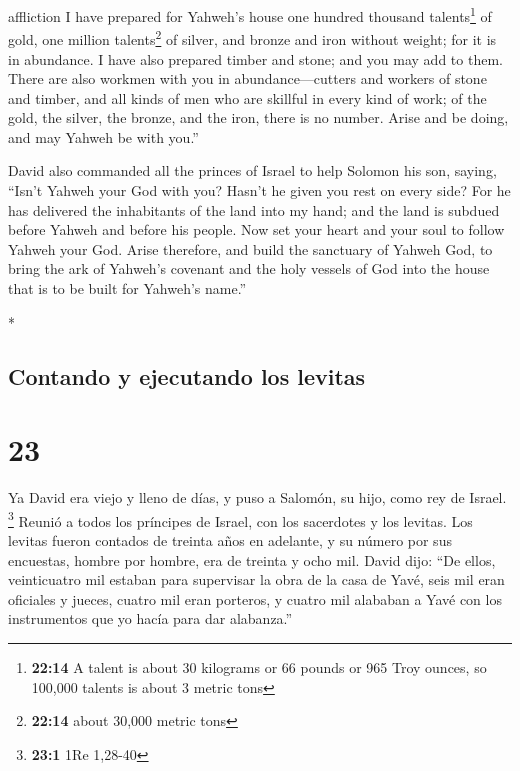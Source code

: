 \begin{paracol}{2}
\begin{otherlanguage}{english}
affliction I have prepared for Yahweh's house one hundred thousand
talents\footnote{\textbf{22:14} A talent is about 30 kilograms or 66
  pounds or 965 Troy ounces, so 100,000 talents is about 3 metric tons}
of gold, one million talents\footnote{\textbf{22:14} about 30,000 metric
  tons} of silver, and bronze and iron without weight; for it is in
abundance. I have also prepared timber and stone; and you may add to
them.  There are also workmen with you in
abundance---cutters and workers of stone and timber, and all kinds of
men who are skillful in every kind of work;  of the gold,
the silver, the bronze, and the iron, there is no number. Arise and be
doing, and may Yahweh be with you.''

 David also commanded all the princes of Israel to help
Solomon his son, saying,  ``Isn't Yahweh your God with
you? Hasn't he given you rest on every side? For he has delivered the
inhabitants of the land into my hand; and the land is subdued before
Yahweh and before his people.  Now set your heart and
your soul to follow Yahweh your God. Arise therefore, and build the
sanctuary of Yahweh God, to bring the ark of Yahweh's covenant and the
holy vessels of God into the house that is to be built for Yahweh's
name.''

\end{otherlanguage}

\switchcolumn[0]*

\hypertarget{contando-y-ejecutando-los-levitas}{%
\subsection{Contando y ejecutando los
levitas}\label{contando-y-ejecutando-los-levitas}}

\hypertarget{section-44}{%
\section{23}\label{section-44}}

 Ya David era viejo y lleno de días, y puso a Salomón, su
hijo, como rey de Israel. \footnote{\textbf{23:1} 1Re 1,28-40}
 Reunió a todos los príncipes de Israel, con los
sacerdotes y los levitas.  Los levitas fueron contados de
treinta años en adelante, y su número por sus encuestas, hombre por
hombre, era de treinta y ocho mil.  David dijo: ``De
ellos, veinticuatro mil estaban para supervisar la obra de la casa de
Yavé, seis mil eran oficiales y jueces,  cuatro mil eran
porteros, y cuatro mil alababan a Yavé con los instrumentos que yo hacía
para dar alabanza.''


\end{paracol}
